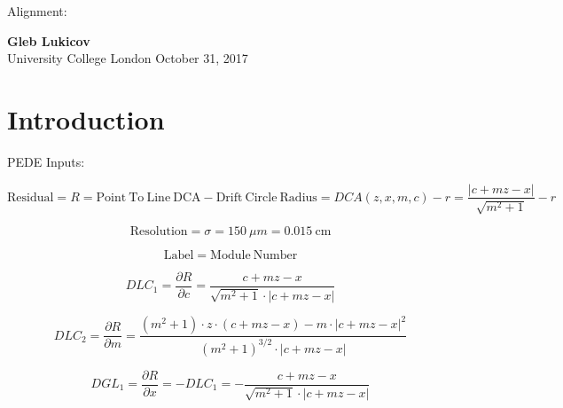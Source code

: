 \documentclass[a4paper,11pt]{article}
\begin{document}
\thispagestyle{empty}
\begin{titlepage}
\begin{center}
\end{center}
\begin{center}
	\vspace{1cm}
	{\huge Alignment:}\\
	\vspace{1.5cm}

	\vspace{6cm}
	{\LARGE\bf Gleb Lukicov}\\
	{\Large University College London}
	\vspace{4cm}
	\vfill
	\vspace{0.9cm}
	{\large October 31, 2017}
\end{center}
\end{titlepage}
\clearpage

\thispagestyle{plain}
\section{Introduction} \label{sec:intro}

PEDE Inputs: 


\begin{equation}	
\mathrm{Residual}= R =\mathrm{Point \ To \ Line \ DCA} - \mathrm{Drift \ Circle \ Radius} = DCA(z,x,m,c) - r = \frac{ |c+mz-x| }  { \sqrt{m^2+1} } -r
\end{equation}


\begin{equation}	
\mathrm{Resolution} = \sigma = 150 \ \mu m = 0.015 \ \mathrm{cm}
\end{equation}

\begin{equation}	
\mathrm{Label}= \mathrm{Module \ Number}
\end{equation}

\begin{equation}
DLC_1 = \frac{\partial R}{\partial c} = \frac{ c+mz-x }  { \sqrt{m^2+1} \cdot |c+mz-x| }
\end{equation}

\begin{equation}
DLC_2 = \frac{ \partial R}{\partial m} = \frac{ (m^2+1)\cdot z\cdot(c+mz-x) - m\cdot |c+mz-x|^2 }{ (m^2+1)^{3/2} \cdot |c+mz-x|  }
\end{equation}

\begin{equation}	
DGL_1 = \frac{\partial R}{\partial x} = - DLC_1 = - \frac{ c+mz-x }  { \sqrt{m^2+1} \cdot |c+mz-x| }
\end{equation}
\end{document}
